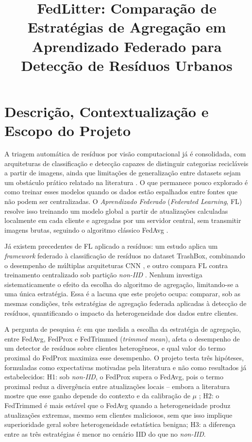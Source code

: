 \documentclass[conference]{IEEEtran}
\title{FedLitter: Comparação de Estratégias de Agregação em Aprendizado Federado para Detecção de Resíduos Urbanos}
\author{
\IEEEauthorblockA{Experiência Criativa: Projeto Transformador II\\
Bacharelado em Ciência da Computação -- PUCPR
\\[3ex]
Turma 8ºA -- Grupo 11 \\
Anabelly Montibeller, Andressa Souza , Camila Vieira, Guilherme Ferraz , Rodrigo Bittencourt \\
{\tt\small \{montibeller.anabelly, andressa.t, camila.oliveira3, ferraz.freire, bittencourt.rodrigo\}@pucpr.edu.br}
}
}
\begin{document}
\maketitle

\section{Descrição, Contextualização e Escopo do Projeto}
\label{sec:intro}

A triagem automática de resíduos por visão computacional já é consolidada, com arquiteturas de classificação e detecção capazes de distinguir categorias recicláveis a partir de imagens, ainda que limitações de generalização entre datasets sejam um obstáculo prático relatado na literatura \cite{lu2022wastemanagement}. O que permanece pouco explorado é como treinar esses modelos quando os dados estão espalhados entre fontes que não podem ser centralizadas. O \textit{Aprendizado Federado} (\textit{Federated Learning}, FL) resolve isso treinando um modelo global a partir de atualizações calculadas localmente em cada cliente e agregadas por um servidor central, sem transmitir imagens brutas, seguindo o algoritmo clássico FedAvg \cite{mcmahan2017}.

Já existem precedentes de FL aplicado a resíduos: um estudo aplica um \textit{framework} federado à classificação de resíduos no dataset TrashBox, combinando o desempenho de múltiplas arquiteturas CNN \cite{khan2024scirep}, e outro compara FL contra treinamento centralizado sob partição \textit{non-IID} \cite{wang2026ijeces}. Nenhum investiga sistematicamente o efeito da escolha do algoritmo de agregação, limitando-se a uma única estratégia. Essa é a lacuna que este projeto ocupa: comparar, sob as mesmas condições, três estratégias de agregação federada aplicadas à detecção de resíduos, quantificando o impacto da heterogeneidade dos dados entre clientes.

A pergunta de pesquisa é: em que medida a escolha da estratégia de agregação, entre FedAvg, FedProx e FedTrimmed (\textit{trimmed mean}), afeta o desempenho de um detector de resíduos sobre clientes heterogêneos, e qual valor do termo proximal do FedProx maximiza esse desempenho. O projeto testa três hipóteses, formuladas como expectativas motivadas pela literatura e não como resultados já estabelecidos: H1: sob \textit{non-IID}, o FedProx supera o FedAvg, pois o termo proximal reduz a divergência entre atualizações locais -- embora a literatura mostre que esse ganho depende do contexto e da calibração de $\mu$ \cite{fedprox2020}; H2: o FedTrimmed é mais estável que o FedAvg quando a heterogeneidade produz atualizações extremas, mesmo sem clientes maliciosos, sem que isso implique superioridade geral sobre heterogeneidade estatística benigna; H3: a diferença entre as três estratégias é menor no cenário IID do que no \textit{non-IID}.
\end{document}
